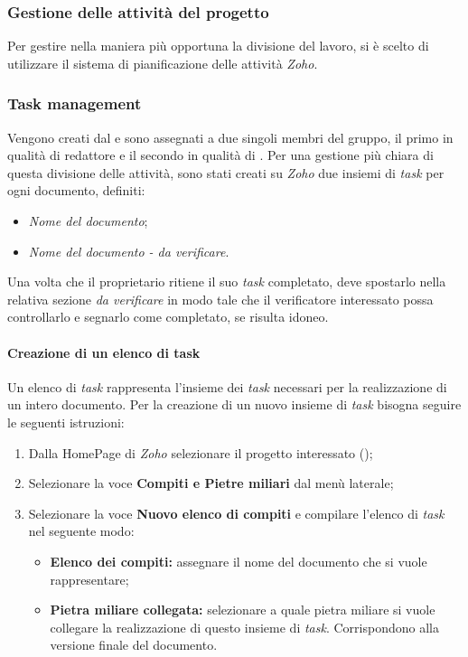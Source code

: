 \subsubsection{Gestione delle attività del progetto}
Per gestire nella maniera più opportuna la divisione del lavoro, si è scelto di
utilizzare il sistema di pianificazione delle attività \textit{Zoho}.

\subsubsection{Task management}
Vengono creati dal \textit{\RdP} e sono assegnati a due singoli membri del gruppo,
il primo in qualità di redattore e il secondo in qualità di \textit{\Ver}.
Per una gestione più chiara di questa divisione delle attività, sono stati creati su \textit{Zoho}
due insiemi di \textit{task} per ogni documento, definiti:
\begin{itemize}
  \item \textit{Nome del documento};
  \item \textit{Nome del documento - da verificare}.
\end{itemize}
Una volta che il proprietario ritiene il suo \textit{task} completato, deve spostarlo
nella relativa sezione \textit{da verificare} in modo tale che il verificatore
interessato possa controllarlo e segnarlo come completato, se risulta idoneo.

\paragraph{Creazione di un elenco di task}
Un elenco di \textit{task} rappresenta l'insieme dei \textit{task} necessari per la realizzazione di un intero documento.
Per la creazione di un nuovo insieme di \textit{task} bisogna seguire le seguenti istruzioni:
\begin{enumerate}
   \item Dalla HomePage di \textit{Zoho} selezionare il progetto interessato (\progetto);
  \item Selezionare la voce \textbf{Compiti e Pietre miliari} dal menù laterale;
   \item Selezionare la voce \textbf{Nuovo elenco di compiti} e compilare l'elenco di \textit{task} nel
  seguente modo:
  \begin{itemize}
    \item \textbf{Elenco dei compiti:} assegnare il nome del documento che si
    vuole rappresentare;
    \item \textbf{Pietra miliare collegata:} selezionare a quale pietra miliare si
    vuole collegare la realizzazione di questo insieme di \textit{task}. Corrispondono alla
    versione finale del documento.
  \end{itemize}
\end{enumerate}
